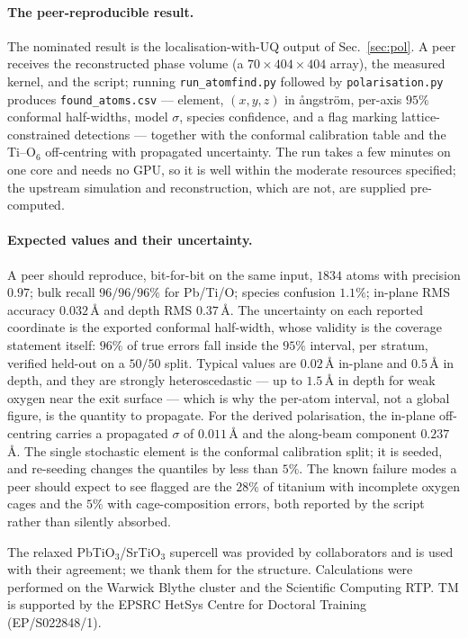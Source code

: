 \documentclass[aps,prb,twocolumn,superscriptaddress,floatfix,nofootinbib]{revtex4-2}
\begin{document}
\paragraph{The peer-reproducible result.} The nominated result is the localisation-with-UQ
output of Sec.~\ref{sec:pol}. A peer receives the reconstructed phase volume (a
$70\times404\times404$ array), the measured kernel, and the script; running
\texttt{run\_atomfind.py} followed by \texttt{polarisation.py} produces
\texttt{found\_atoms.csv} --- element, $(x,y,z)$ in \aa{}ngstr\"om, per-axis $95\%$ conformal
half-widths, model $\sigma$, species confidence, and a flag marking lattice-constrained
detections --- together with the conformal calibration table and the Ti--O$_6$ off-centring with
propagated uncertainty. The run takes a few minutes on one core and needs no GPU, so it is well
within the moderate resources specified; the upstream simulation and reconstruction, which are
not, are supplied pre-computed.

\paragraph{Expected values and their uncertainty.} A peer should reproduce, bit-for-bit on the
same input, $1834$ atoms with precision $0.97$; bulk recall $96/96/96\%$ for Pb/Ti/O; species
confusion $1.1\%$; in-plane RMS accuracy $0.032$\,\AA{} and depth RMS $0.37$\,\AA. The
uncertainty on each reported coordinate is the exported conformal half-width, whose validity is
the coverage statement itself: $96\%$ of true errors fall inside the $95\%$ interval, per
stratum, verified held-out on a $50/50$ split. Typical values are $0.02$\,\AA{} in-plane and
$0.5$\,\AA{} in depth, and they are strongly heteroscedastic --- up to $1.5$\,\AA{} in depth for
weak oxygen near the exit surface --- which is why the per-atom interval, not a global figure,
is the quantity to propagate. For the derived polarisation, the in-plane off-centring carries a
propagated $\sigma$ of $0.011$\,\AA{} and the along-beam component $0.237$\,\AA. The single
stochastic element is the conformal calibration split; it is seeded, and re-seeding changes the
quantiles by less than $5\%$. The known failure modes a peer should expect to see flagged are
the $28\%$ of titanium with incomplete oxygen cages and the $5\%$ with cage-composition errors,
both reported by the script rather than silently absorbed.

\begin{acknowledgments}
The relaxed PbTiO$_3$/SrTiO$_3$ supercell was provided by collaborators and is used with
their agreement; we thank them for the structure. Calculations were performed on the Warwick
Blythe cluster and the Scientific Computing RTP. TM is supported by the EPSRC HetSys Centre for
Doctoral Training (EP/S022848/1).
\end{acknowledgments}



\end{document}
